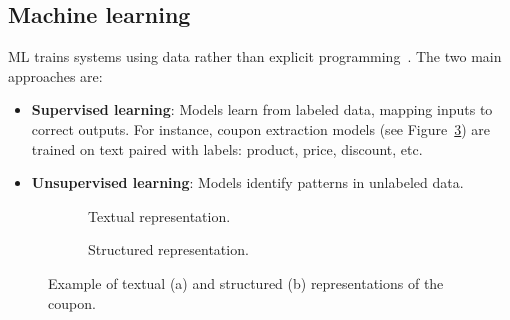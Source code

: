 \documentclass[licencjacka,en]{pracamgr}
\begin{document}
\subsection{Machine learning}
ML trains systems using data rather than explicit programming~\cite{francuz_3}. The two main approaches are:

\begin{itemize}
    \item \textbf{Supervised learning}: Models learn from labeled data, mapping inputs to correct outputs. For instance, coupon extraction models (see Figure~\ref{list:input}) are trained on text paired with labels: product, price, discount, etc.

    \item \textbf{Unsupervised learning}: Models identify patterns in unlabeled data.
\end{itemize}

\begin{figure}[htbp]
    \centering
    \begin{subfigure}{0.9\textwidth}
        \caption{Textual representation.}
        \label{list:tr}
    \end{subfigure}

    \vspace{5mm}

    \begin{subfigure}{0.9\textwidth}
        \caption{Structured representation.}
        \label{list:sr}
    \end{subfigure}

    \caption{Example of textual (a) and structured (b) representations of the coupon.}
    \label{list:input}
\end{figure}
\end{document}
